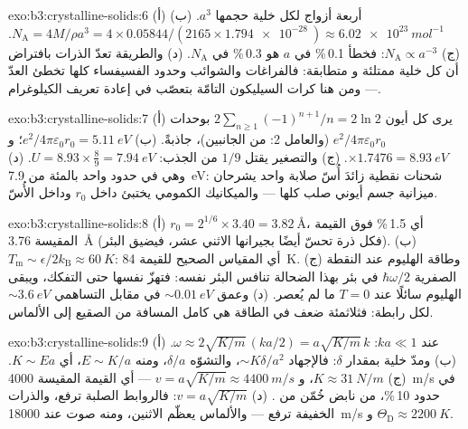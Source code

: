 \begin{solution}{exo:b3:crystalline-solids:6}
(أ) أربعة أزواج لكل خلية حجمها $a^3$. (ب) $N_{\text{A}} =
4M/\rho a^3 = 4\times0.05844/(2165\times\qty{1.794e-28}{})
\approx \qty{6.02e23}{mol^{-1}}$. (ج) $N_{\text{A}} \propto
a^{-3}$: فخطأ 0.1\,\% في $a$ هو 0.3\,\% في $N_{\text{A}}$. (د)
والطريقة تعدّ الذرات بافتراض أن كل خلية ممتلئة و
متطابقة: فالفراغات والشوائب وحدود الفسيفساء كلها
تخطئ العدّ --- ومن هنا كرات السيليكون التامّة بتعصّب في
إعادة تعريف الكيلوغرام.
\end{solution}

\begin{solution}{exo:b3:crystalline-solids:7}
(أ) يرى كل أيون $2\sum_{n\ge1}(-1)^{n+1}/n = 2\ln2$ بوحدات
$e^2/4\pi\varepsilon_0r_0$ (والعامل 2: من الجانبين)، جاذبةً. (ب)
$e^2/4\pi\varepsilon_0r_0 = \qty{5.11}{eV}$؛ و $\times1.7476 =
\qty{8.93}{eV}$. (ج) والتصغير يقتل $1/9$ من الجذب:
$U = 8.93\times\tfrac89 = \qty{7.94}{eV}$. (د) وهي في حدود واحد بالمئة
من \qty{7.9}{eV}:  شحنات نقطية زائدَ أُسّ صلابة
واحد يشرحان ميزانية جسم أيوني صلب كلها --- والميكانيك
الكمومي يختبئ داخل $r_0$ وداخل الأُسّ.
\end{solution}

\begin{solution}{exo:b3:crystalline-solids:8}
(أ) $r_0 = 2^{1/6}\times3.40 = \qty{3.82}{\angstrom}$، أي 1.5\,\%
فوق القيمة المقيسة \qty{3.76}{\angstrom} (فكل ذرة تحسّ أيضًا
بجيرانها الاثني عشر، فيضيق البئر). (ب)
$T_{\text{m}} \sim \epsilon/2k_{\text{B}} \approx \qty{60}{K}$:
أي المقياس الصحيح للقيمة \qty{84}{K}. (ج) وطاقة الهليوم عند النقطة الصفرية
$\hbar\omega/2$ في بئر بهذا الضحالة تنافس البئر نفسه:
فتهزّ  نفسها حتى التفكك، ويبقى الهليوم سائلًا عند $T = 0$
ما لم يُعصر. (د) وعمق $\sim\qty{0.01}{eV}$ في مقابل التساهمي
$\sim\qty{3.6}{eV}$ لكل رابطة: فثلاثمئة ضعف في الطاقة هي
كامل المسافة من الصقيع إلى الألماس.
\end{solution}

\begin{solution}{exo:b3:crystalline-solids:9}
(أ) عند $ka \ll 1$: $\omega \approx 2\sqrt{K/m}\,(ka/2) =
a\sqrt{K/m}\,k$. (ب) ومدّ خلية بمقدار $\delta$: فالإجهاد $\sim
K\delta/a^2$، والتشوّه $\delta/a$، ومنه $E \sim K/a$، أي $K \sim
Ea$. (ج) $K \approx \qty{31}{N/m}$، و $v = a\sqrt{K/m} \approx
\qty{4400}{m/s}$ --- أي القيمة المقيسة \qty{4000}{m/s} في حدود 10\,\%،
من نابض خُمّن من . (د) $v = a\sqrt{K/m}$:
فالروابط الصلبة ترفع، والذرات الخفيفة ترفع --- والألماس يعظّم الاثنين، ومنه
صوت عند \qty{18000}{m/s} و $\Theta_{\text{D}} \approx
\qty{2200}{K}$.
\end{solution}

